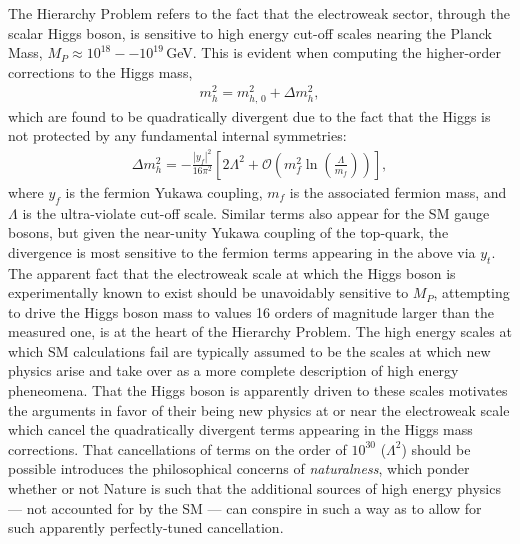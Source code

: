 \begin{description}
        The Hierarchy Problem refers to the fact that the electroweak sector, through the scalar Higgs boson,
        is sensitive to high energy cut-off scales nearing the Planck Mass, $M_{P} \approx 10^{18}--10^{19}$\,GeV.
        This is evident when computing the higher-order corrections to the Higgs mass,
        \begin{align*}
            m_h^2 = m_{h,\,0}^2 + \Delta m_h^2,
        \end{align*}
        which are found to be quadratically divergent due to the fact that the Higgs is not protected by any fundamental
        internal symmetries:
        \begin{align}
            \Delta m_h^2 = -\frac{ |y_f|^2 }{16 \pi^2} \left[ 2 \Lambda^2  + \mathcal{O} \left( m_f^2 \ln \left( \frac{\Lambda}{m_f} \right) \right) \right],
        \end{align}
        where $y_f$ is the fermion Yukawa coupling, $m_f$ is the associated fermion mass, and $\Lambda$ is the
        ultra-violate cut-off scale.
        Similar terms also appear for the SM gauge bosons, but given the near-unity Yukawa coupling of the top-quark,
        the divergence is most sensitive to the fermion terms appearing in the above via $y_t$.
        The apparent fact that the electroweak scale at which the Higgs boson is experimentally known to exist
        should be unavoidably sensitive to $M_P$, attempting to drive the Higgs boson mass to values 16 orders
        of magnitude larger than the measured one,
        is at the heart of the Hierarchy Problem.
        The high energy scales at which SM calculations fail are typically assumed to be the scales
        at which new physics arise and take over as a more complete description of high energy pheneomena.
        That the Higgs boson is apparently driven to these scales motivates the arguments in favor
        of their being new physics at or near the electroweak scale which cancel the quadratically
        divergent terms appearing in the Higgs mass corrections.
        That cancellations of terms on the order of $10^{30}$ ($\Lambda^2$) should be possible introduces the
        philosophical concerns of \textit{naturalness}, which ponder whether or not Nature is such
        that the additional sources of high energy physics --- not accounted for by the SM --- can conspire in such a way as to
        allow for such apparently perfectly-tuned cancellation.
\end{description}

